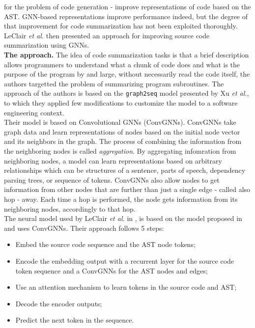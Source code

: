 for the problem of code generation - improve representations of code based on the AST.
GNN-based representations improve performance indeed, but the degree of that improvement 
for code summarization has not been exploited thoroughly. 
LeClair \textit{et al.} \cite{Leclair2020} then presented an approach for improving source code summarization using 
GNNs.\\
\newline
\textbf{The approach.}
The idea of code summarization tasks is that a brief description allows programmers to understand
what a chunk of code does and what is the purpose of the program by and large, without necessarily read the code 
itself, the authors targetted the problem of summarizing program subroutines.
The approach of the authors is based on the \texttt{graph2seq} model presented by Xu \textit{et al.}\cite{xu2018graph2seq}, to which they applied few modifications 
to customize the model to a software engineering context.\\
Their model is based on Convolutional GNNs (ConvGNNs). ConvGNNs take graph data and learn representations 
of nodes based on the initial node vector and its neighbors in the graph. 
The process of combining the information from the neighboring nodes is called \textit{aggregation}. By aggregating
infomration from neighboring nodes, a model can learn representations based on arbitrary relationships which can be structures of a sentence, parts of speech, dependency parsing 
trees, or sequence of tokens. ConvGNNs also allow nodes to get information from other nodes 
that are further than just a single edge - called also hop - away. Each time a hop is performed, 
the node gets information from its neighboring nodes, accordingly to that hop.\\
The neural model used by LeClair \textit{et al.} in \cite{Leclair2020}, is based on the model proposed in
\cite{leclair2019neural} and uses ConvGNNs. Their approach follows 5 steps:
\begin{itemize}
    \item Embed the source code sequence and the AST node tokens;
    \item Encode the embedding output with a recurrent layer for the source code token sequence and a ConvGNNs for the AST nodes and edges;
    \item Use an attention mechanism to learn tokens in the source code and AST;
    \item Decode the encoder outputs;
    \item Predict the next token in the sequence.
\end{itemize} 
